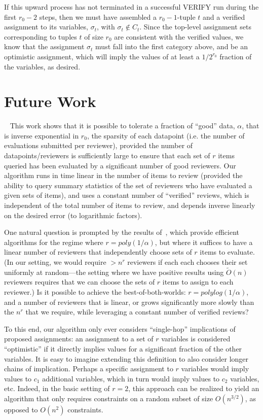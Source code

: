 \documentclass[anon,12pt]{colt2018}
\begin{document}
If this upward process has not terminated in a successful VERIFY run during the first $r_0-2$ steps, then we must have assembled a $r_0-1$-tuple $t$ and a verified assignment to its variables, $\sigma_t$, with $\sigma_t \not \in C_t$.  Since the top-level assignment sets corresponding to tuples $t$ of size $r_0$ are consistent with the verified values, we know that the assignment $\sigma_t$ must fall into the first category above, and be an optimistic assignment, which will imply the values of at least a $1/2^{r_0}$ fraction of the variables, as desired.


\fi




\section{Future Work}~\label{sec:futureWork}
This work shows that it is possible to tolerate a fraction of ``good'' data, $\alpha$, that is inverse exponential in $r_0$, the sparsity of each datapoint (i.e. the number of evaluations submitted per reviewer), provided the number of datapoints/reviewers is sufficiently large to ensure that each set of $r$ items queried has been evaluated by a significant number of good reviewers.  Our algorithm runs in time linear in the number of items to review (provided the ability to query summary statistics of the set of reviewers who have evaluated a given sets of items), and uses a constant number of ``verified'' reviews, which is independent of the total number of items to review, and depends inverse linearly on the desired error (to logarithmic factors).

One natural question is prompted by the results of~\cite{steinhardt2016avoiding}, which provide efficient algorithms for the regime where $r= poly(1/\alpha)$, but where it suffices to have a linear number of reviewers that independently choose sets of $r$ items to evaluate.  (In our setting, we would require $>n^r$ reviewers if each each chooses their set uniformly at random---the setting where we have positive results using $\tilde{O}(n)$ reviewers requires that we can choose the sets of $r$ items to assign to each reviewer.)  Is it possible to achieve the best-of-both-worlds: $r=polylog(1/\alpha)$, and a number of reviewers that is linear, or grows significantly more slowly than the $n^r$ that we require, while leveraging a constant number of verified reviews?

To this end, our algorithm only ever considers ``single-hop'' implications of proposed assignments: an assignment to a set of $r$ variables is considered ``optimistic'' if it directly implies values for a significant fraction of the other variables.  It is easy to imagine extending this definition to also consider longer chains of implication.  Perhaps a specific assignment to $r$ variables would imply values to $c_1$ additional variables, which in turn would imply values to $c_2$ variables, etc.   Indeed, in the basic setting of $r=2$, this approach can be realized to yield an algorithm that only requires constraints on a random subset of size $O(n^{3/2})$, as opposed to $O(n^2)$ constraints.
\end{document}
